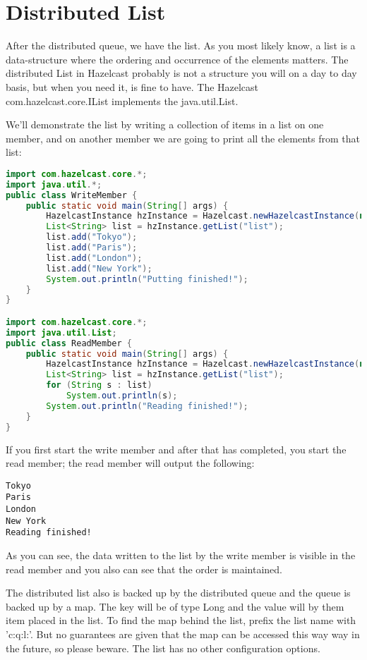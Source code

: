 \section{Distributed List}
After the distributed queue, we have the list. As you most likely know, a list is a data-structure where the ordering and occurrence of the elements matters. The distributed List in Hazelcast probably is not a structure you will on a day to day basis, but when you need it, is fine to have. The Hazelcast com.hazelcast.core.IList implements the java.util.List.

We'll demonstrate the list by writing a collection of items in a list on one member, and on another member we are going to print all the elements from that list:
\begin{lstlisting}[language=java]
import com.hazelcast.core.*;
import java.util.*;
public class WriteMember {
    public static void main(String[] args) {
        HazelcastInstance hzInstance = Hazelcast.newHazelcastInstance(null);
        List<String> list = hzInstance.getList("list");
        list.add("Tokyo");
        list.add("Paris");
        list.add("London");
        list.add("New York");
        System.out.println("Putting finished!");
    }
}

import com.hazelcast.core.*;
import java.util.List;
public class ReadMember {
    public static void main(String[] args) {
        HazelcastInstance hzInstance = Hazelcast.newHazelcastInstance(null);
        List<String> list = hzInstance.getList("list");
        for (String s : list) 
            System.out.println(s);
        System.out.println("Reading finished!");
    }
}
\end{lstlisting}
If you first start the write member and after that has completed, you start the read member; the read member will output the following:
\begin{verbatim}
Tokyo
Paris
London
New York
Reading finished!
\end{verbatim}
As you can see, the data written to the list by the write member is visible in the read member and you also can see that the order is maintained.

The distributed list also is backed up by the distributed queue and the queue is backed up by a map. The key will be of type Long and the value will by them item placed in the list. To find the map behind the list, prefix the list name with 'c:q:l:'. But no guarantees are given that the map can be accessed this way way in the future, so please beware. The list has no other configuration options.

